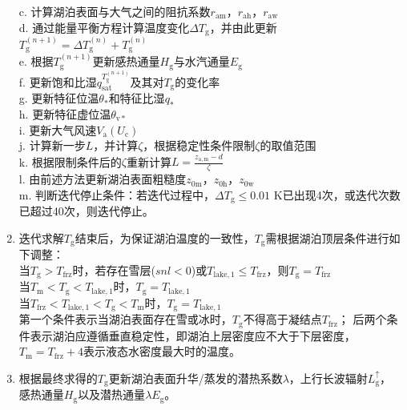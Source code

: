 \begin{enumerate}
    c. 计算湖泊表面与大气之间的阻抗系数$r_{\mathrm{am}}$，$r_{\mathrm{ah}}$，$r_{\mathrm{aw}}$ \\
    d. 通过能量平衡方程计算温度变化$\Delta T_{\mathrm {g}} $，并由此更新$T_{\mathrm {g}} ^{\left(n+1\right)}=\Delta T_{\mathrm {g}} ^{\left(n\right)}+T_{\mathrm {g}} ^{\left(n\right)}$ \\
    e. 根据$T_{\mathrm {g}} ^{\left(n+1\right)}$更新感热通量$H_{\mathrm {g}} $与水汽通量$E_{\mathrm {g}} $ \\
    f. 更新饱和比湿$q_{\mathrm{sat}}^{T_{\mathrm {g}} ^{\left(n+1\right)}}$及其对$T_{\mathrm {g}} $的变化率 \\
    g. 更新特征位温$\theta_\ast$和特征比湿$q_\ast$ \\
    h. 更新特征虚位温$\theta_{\mathrm{v\ast}}$ \\
    i. 更新大气风速$V_{\mathrm {a}} \left(U_{\mathrm {c}} \right)$ \\
    j. 计算新一步$L$，并计算$\zeta$，根据稳定性条件限制$\zeta$的取值范围 \\
    k. 根据限制条件后的$\zeta$重新计算$L=\frac{z_{\mathrm{a,m}}-d}{\zeta}$ \\
    l. 由前述方法更新湖泊表面粗糙度$z_{\mathrm{0m}}$，$z_{\mathrm{0h}}$，$z_{\mathrm{0w}}$\\
    m. 判断迭代停止条件：若迭代过程中，$\Delta T_{\mathrm {g}} \leqslant 0.01$ K已出现4次，或迭代次数已超过40次，则迭代停止。
  \item 迭代求解$T_{\mathrm {g}} $结束后，为保证湖泊温度的一致性，$T_{\mathrm {g}} $需根据湖泊顶层条件进行如下调整：\\
    当$T_{\mathrm {g}} >T_{\mathrm {frz}} $时，若存在雪层($snl<0$)或$T_{\mathrm{lake,1}}\leqslant T_{\mathrm {frz}} $，则$T_{\mathrm {g}} =T_{\mathrm {frz}} $ \\
    当$T_{\mathrm {m}} <T_{\mathrm {g}} <T_{\mathrm{lake,1}}$时，$T_{\mathrm {g}} =T_{\mathrm{lake,1}}$ \\
    当$T_{\mathrm {frz}} <T_{\mathrm{lake,1}}<T_{\mathrm {g}} <T_{\mathrm {m}} $时，$T_{\mathrm {g}} =T_{\mathrm{lake,1}}$ \\
    第一个条件表示当湖泊表面存在雪或冰时，$T_{\mathrm {g}} $不得高于凝结点$T_{\mathrm {frz}} $；
    后两个条件表示湖泊应遵循垂直稳定性，即湖泊上层密度应不大于下层密度，$T_{\mathrm {m}} =T_{\mathrm {frz}} +4$表示液态水密度最大时的温度。
  \item 根据最终求得的$T_{\mathrm {g}} $更新湖泊表面升华/蒸发的潜热系数$\lambda$，上行长波辐射$L_{\mathrm {g}} ^\uparrow$，
    感热通量$H_{\mathrm {g}} $以及潜热通量$\lambda E_{\mathrm {g}} $。

\end{enumerate}
